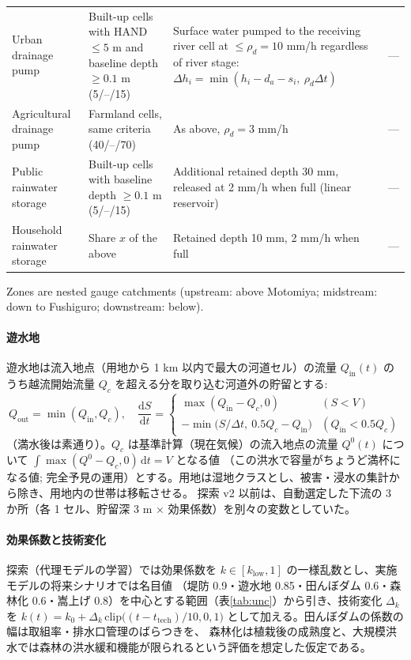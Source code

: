 \documentclass[a4paper,10pt]{ltjsarticle}
\begin{document}
\begin{table}[tbp]
\begin{tabularx}{\textwidth}{@{}>{\raggedright\arraybackslash}p{20mm} >{\raggedright\arraybackslash}p{38mm} L >{\raggedright\arraybackslash}p{30mm}@{}}
Urban drainage pump & Built-up cells with HAND $\le5$ m and baseline depth $\ge0.1$ m (5/--/15) &
  Surface water pumped to the receiving river cell at $\le\rho_d=10$ mm/h regardless of river stage: $\Delta h_i=\min(h_i-d_a-s_i,\ \rho_d\Delta t)$ & --- \\
Agricultural drainage pump & Farmland cells, same criteria (40/--/70) & As above, $\rho_d=3$ mm/h & --- \\
Public rainwater storage & Built-up cells with baseline depth $\ge0.1$ m (5/--/15) & Additional retained depth 30 mm, released at 2 mm/h when full (linear reservoir) & --- \\
Household rainwater storage & Share $x$ of the above & Retained depth 10 mm, 2 mm/h when full & --- \\
\bottomrule
\end{tabularx}
\par\footnotesize Zones are nested gauge catchments (upstream: above Motomiya; midstream: down to Fushiguro; downstream: below).
\end{table}

\paragraph{遊水地}
遊水地は流入地点（用地から 1 km 以内で最大の河道セル）の流量 $Q_{\mathrm{in}}(t)$ のうち越流開始流量 $Q_c$ を超える分を取り込む河道外の貯留とする:
\begin{equation}
Q_{\mathrm{out}}=\min(Q_{\mathrm{in}},Q_c),\quad
\frac{\mathrm{d}S}{\mathrm{d}t}=
\begin{cases}
\max(Q_{\mathrm{in}}-Q_c,0) & (S<V)\\
-\min\bigl(S/\Delta t,\ 0.5Q_c-Q_{\mathrm{in}}\bigr) & (Q_{\mathrm{in}}<0.5Q_c)
\end{cases}
\label{eq:retention}
\end{equation}
（満水後は素通り）。$Q_c$ は基準計算（現在気候）の流入地点の流量 $Q^0(t)$ について $\int\max(Q^0-Q_c,0)\,\mathrm{d}t=V$ となる値
（この洪水で容量がちょうど満杯になる値; 完全予見の運用）とする。用地は湿地クラスとし、被害・浸水の集計から除き、用地内の世帯は移転させる。
探索 v2 以前は、自動選定した下流の 3 か所（各 1 セル、貯留深 3 m × 効果係数）を別々の変数としていた。

\paragraph{効果係数と技術変化}
探索（代理モデルの学習）では効果係数を $k\in[k_{\mathrm{low}},1]$ の一様乱数とし、実施モデルの将来シナリオでは名目値
（堤防 0.9・遊水地 0.85・田んぼダム 0.6・森林化 0.6・嵩上げ 0.8）を中心とする範囲（表\ref{tab:unc}）から引き、技術変化 $\Delta_k$ を
$k(t)=k_0+\Delta_k\,\mathrm{clip}\bigl((t-t_{\mathrm{tech}})/10,0,1\bigr)$ として加える。田んぼダムの係数の幅は取組率・排水口管理のばらつきを、
森林化は植栽後の成熟度と、大規模洪水では森林の洪水緩和機能が限られるという評価\cite{scj2001,kuraji2004}を想定した仮定である。
\end{document}

